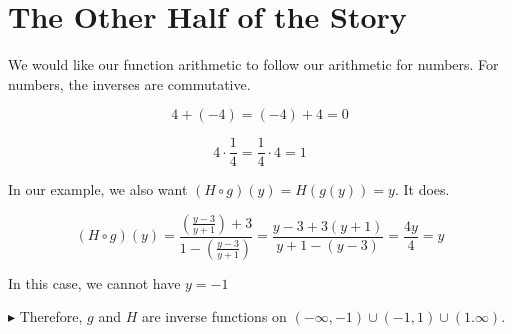 \documentclass{ximera}
\begin{document}
\section{The Other Half of the Story}


We would like our function arithmetic to follow our arithmetic for numbers.  For numbers, the inverses are commutative.

\[
4 + (-4) = (-4) + 4 = 0
\]


\[
4 \cdot \frac{1}{4} = \frac{1}{4} \cdot 4 = 1
\]



In our example, we also want $(H \circ g)(y) = H(g(y)) = y$. It does.


\[
(H \circ g)(y) = \frac{\left( \frac{y-3}{y+1} \right) + 3}{1 - \left(  \frac{y-3}{y+1}\right)} = \frac{y-3 + 3(y+1)}{y+1-(y-3)} = \frac{4y}{4} = y
\]


In this case, we cannot have $y = -1$






$\blacktriangleright$  Therefore, $g$ and $H$ are inverse functions on $(-\infty, -1) \cup (-1, 1) \cup (1. \infty)$.
\end{document}
